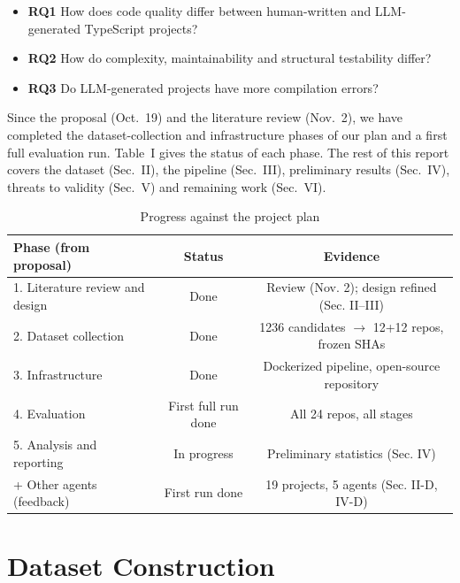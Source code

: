 \documentclass[10pt,conference]{IEEEtran}
\begin{document}
\begin{itemize}
\item \textbf{RQ1} How does code quality differ between human-written and LLM-generated TypeScript projects?
\item \textbf{RQ2} How do complexity, maintainability and structural testability differ?
\item \textbf{RQ3} Do LLM-generated projects have more compilation errors?
\end{itemize}

Since the proposal (Oct.~19) and the literature review (Nov.~2), we have completed the dataset-collection and infrastructure phases of our plan and a first full evaluation run. Table~I gives the status of each phase. The rest of this report covers the dataset (Sec.~II), the pipeline (Sec.~III), preliminary results (Sec.~IV), threats to validity (Sec.~V) and remaining work (Sec.~VI).

\begin{table}[t]
\caption{Progress against the project plan}
\label{tab:progress}
\centering
\scriptsize
\setlength{\tabcolsep}{2.5pt}
\begin{tabular}{lcc}
\toprule
Phase (from proposal) & Status & Evidence \\
\midrule
1. Literature review and design & Done & Review (Nov. 2); design refined (Sec. II--III) \\
2. Dataset collection & Done & 1236 candidates $\rightarrow$ 12+12 repos, frozen SHAs \\
3. Infrastructure & Done & Dockerized pipeline, open-source repository \\
4. Evaluation & First full run done & All 24 repos, all stages \\
5. Analysis and reporting & In progress & Preliminary statistics (Sec. IV) \\
+ Other agents (feedback) & First run done & 19 projects, 5 agents (Sec. II-D, IV-D) \\
\bottomrule
\end{tabular}
\end{table}

\section{Dataset Construction}
\end{document}
